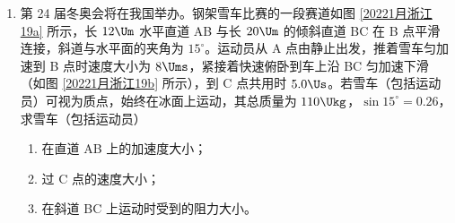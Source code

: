 \documentclass[\gkver]{gaokaozhenti}
\begin{document}
\begin{enumerate}
{	$S'=\frac{\rho}{k_{b}}=\frac{0.99\times10^{-6}}{\frac{2.2-1.4}{0.44-0.20}}\approx29.7\times10^{-8}\Umq$

	解得

	$S_{\text{乙}}=S'-S\approx22.7\times10^{-8}\Umq>S$

	故合金丝甲的横截面积小于合金丝乙的横截面积。
}

\item
第 24 届冬奥会将在我国举办。钢架雪车比赛的一段赛道如图 \ref{20221月浙江19a} 所示，长 $12\Um$ 水平直道 AB 与长 $20\Um$ 的倾斜直道 BC 在 B 点平滑连接，斜道与水平面的夹角为 $15^{\circ}$。运动员从 A 点由静止出发，推着雪车匀加速到 B 点时速度大小为 $8\Ums$，紧接着快速俯卧到车上沿 BC 匀加速下滑（如图 \ref{20221月浙江19b} 所示），到 C 点共用时 $5.0\Us$。若雪车（包括运动员）可视为质点，始终在冰面上运动，其总质量为 $110\Ukg$，$\sin15^{\circ}=0.26$，求雪车（包括运动员）


\begin{enumerate}
	\item
	在直道 AB 上的加速度大小；

	\item
	过 C 点的速度大小；

	\item
	在斜道 BC 上运动时受到的阻力大小。
\end{enumerate}

\end{enumerate}
\end{document}
